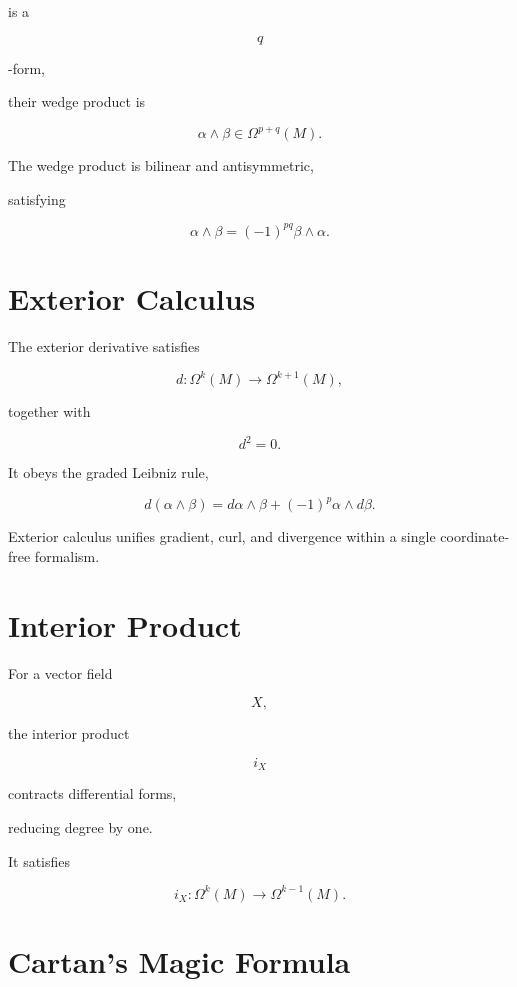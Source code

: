 \documentclass[11pt,fleqn]{book}
\numberwithin{equation}{chapter}
\theoremstyle{plain}
\theoremstyle{definition}
\theoremstyle{remark}
\begin{document}
is a

\[
q
\]

-form,

their wedge product is

\[
\boxed{
\alpha\wedge\beta
\in
\Omega^{p+q}(M).
}
\]

The wedge product is bilinear and antisymmetric,

satisfying

\[
\alpha\wedge\beta
=
(-1)^{pq}
\beta\wedge\alpha.
\]


\section{Exterior Calculus}

The exterior derivative satisfies

\[
d:\Omega^k(M)\rightarrow\Omega^{k+1}(M),
\]

together with

\[
d^2=0.
\]

It obeys the graded Leibniz rule,

\[
\boxed{
d(\alpha\wedge\beta)
=
d\alpha\wedge\beta
+
(-1)^p
\alpha\wedge d\beta.
}
\]

Exterior calculus unifies gradient, curl, and divergence within a single
coordinate-free formalism.


\section{Interior Product}

For a vector field

\[
X,
\]

the interior product

\[
i_X
\]

contracts differential forms,

reducing degree by one.

It satisfies

\[
i_X:
\Omega^k(M)
\rightarrow
\Omega^{k-1}(M).
\]


\section{Cartan's Magic Formula}
\end{document}
